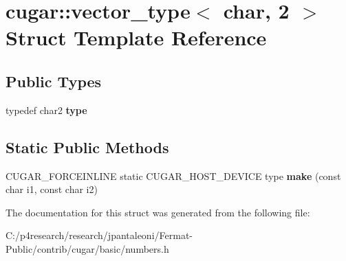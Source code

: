 \hypertarget{structcugar_1_1vector__type_3_01char_00_012_01_4}{}\section{cugar\+:\+:vector\+\_\+type$<$ char, 2 $>$ Struct Template Reference}
\label{structcugar_1_1vector__type_3_01char_00_012_01_4}
\subsection*{Public Types}
\begin{DoxyCompactItemize}
\item 
\mbox{\label{structcugar_1_1vector__type_3_01char_00_012_01_4_abfc03f1fa27cfee81aeae61dd32bf140}} 
typedef char2 {\bfseries type}
\end{DoxyCompactItemize}
\subsection*{Static Public Methods}
\begin{DoxyCompactItemize}
\item 
\mbox{\label{structcugar_1_1vector__type_3_01char_00_012_01_4_a87b1581a5dc995dd018b53b0ae6a2aea}} 
C\+U\+G\+A\+R\+\_\+\+F\+O\+R\+C\+E\+I\+N\+L\+I\+NE static C\+U\+G\+A\+R\+\_\+\+H\+O\+S\+T\+\_\+\+D\+E\+V\+I\+CE type {\bfseries make} (const char i1, const char i2)
\end{DoxyCompactItemize}


The documentation for this struct was generated from the following file\+:\begin{DoxyCompactItemize}
\item 
C\+:/p4research/research/jpantaleoni/\+Fermat-\/\+Public/contrib/cugar/basic/numbers.\+h\end{DoxyCompactItemize}
